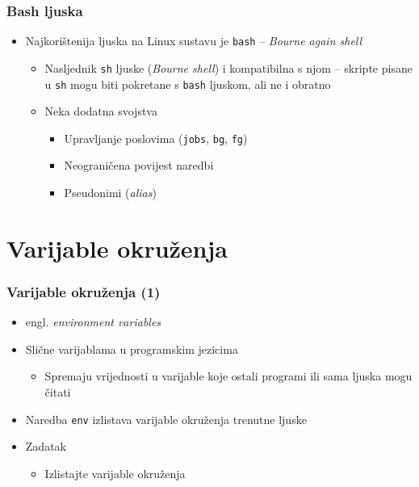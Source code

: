 \documentclass[table,usenames,dvipsnames]{beamer}
\newcommand{\shell}[1]{\texttt{#1}}
\begin{document}
\begin{frame}[t]
\frametitle{Bash ljuska}
\begin{itemize}
  \item Najkorištenija ljuska na Linux sustavu je \shell{bash} -- 
        \emph{Bourne again shell}
  \begin{itemize}
    \item Nasljednik \shell{sh} ljuske (\emph{Bourne shell}) i 
      kompatibilna s njom -- skripte pisane u \shell{sh} mogu biti 
      pokretane s \shell{bash} ljuskom, ali ne i obratno
    \item Neka dodatna svojstva
    \begin{itemize}
      \item Upravljanje poslovima (\shell{jobs}, \shell{bg}, \shell{fg})
      \item Neograničena povijest naredbi
      \item Pseudonimi (\emph{alias})
    \end{itemize}
  \end{itemize}
\end{itemize}
\end{frame}

\section{Varijable okruženja}
\begin{frame}[t]
\frametitle{Varijable okruženja (1)}
\begin{itemize}
  \item engl. \emph{environment variables}
  \item Slične varijablama u programskim jezicima
  \begin{itemize}
    \item Spremaju vrijednosti u varijable koje ostali programi ili sama 
          ljuska mogu čitati
  \end{itemize}
  \item Naredba \shell{env} izlistava varijable okruženja trenutne ljuske
  \item Zadatak
  \begin{itemize}
    \item Izlistajte varijable okruženja
  \end{itemize}
\end{itemize}
\end{frame}
\end{document}
